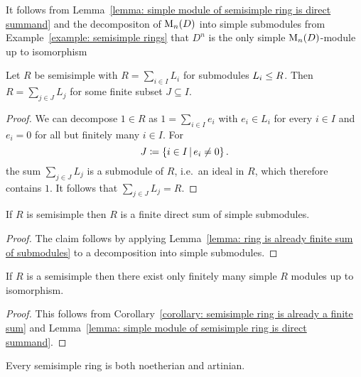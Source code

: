 \begin{example}
  \label{example: D^n is the only simple M_n(D)-module}
  It follows from Lemma~\ref{lemma: simple module of semisimple ring is direct summand} and the decompositon of $\operatorname{M}_n(D)$ into simple submodules from Example~\ref{example: semisimple rings} that $D^n$ is the only simple $\operatorname{M}_n(D)$-module up to isomorphism
\end{example}


\begin{lemma}
  \label{lemma: ring is already finite sum of submodules}
  Let $R$ be semisimple with $R = \sum_{i \in I} L_i$ for submodules $L_i \leq R$.
  Then $R = \sum_{j \in J} L_j$ for some finite subset $J \subseteq I$.
\end{lemma}


\begin{proof}
  We can decompose $1 \in R$ as $1 = \sum_{i \in I} e_i$ with $e_i \in L_i$ for every $i \in I$ and $e_i = 0$ for all but finitely many $i \in I$.
  For
  \[
              J
    \defined  \{ i \in I \suchthat e_i \neq 0 \} \,.
  \]
  the sum $\sum_{j \in J} L_j$ is a submodule of $R$, i.e.\ an ideal in $R$, which therefore contains $1$.
  It follows that $\sum_{j \in J} L_j = R$.
\end{proof}


\begin{corollary}
  \label{corollary: semisimple ring is already a finite sum}
  If $R$ is semisimple then $R$ is a finite direct sum of simple submodules.
\end{corollary}


\begin{proof}
 The claim follows by applying Lemma~\ref{lemma: ring is already finite sum of submodules} to a decomposition into simple submodules.
\end{proof}


\begin{corollary}
  \label{corollary: ss rings have only finitely many simple modules}
  If $R$ is a semisimple then there exist only finitely many simple $R$ modules up to isomorphism.
\end{corollary}


\begin{proof}
  This follows from Corollary~\ref{corollary: semisimple ring is already a finite sum} and Lemma~\ref{lemma: simple module of semisimple ring is direct summand}.
\end{proof}


\begin{corollary}
  \label{corollary: semisimple rings are notherian artinian}
  Every semisimple ring is both noetherian and artinian.
\end{corollary}


